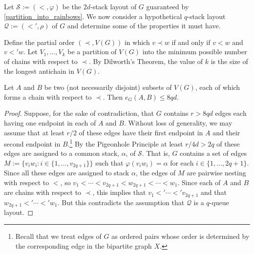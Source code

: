\documentclass{patmorin}
\begin{document}
Let $\mathcal{S}:=(<,\varphi)$ be the $2d$-stack layout of $G$ guaranteed by \cref{partition_into_rainbows}.  We now consider a hypothetical $q$-stack layout $\mathcal{Q}:=(<',\rho)$ of $G$ and determine some of the properties it must have.

Define the partial order $(\prec,V(G))$ in which $v\prec w$ if and only if $v < w$ and $v <' w$.  Let $V_1,\ldots,V_k$ be a partition of $V(G)$ into the minimum possible number of chains with respect to $\prec$.  By Dilworth's Theorem, the value of $k$ is the size of the longest antichain in $V(G)$.

\begin{lem}\label{few_edges_between_sets}
  Let $A$ and $B$ be two (not necessarily disjoint) subsets of $V(G)$, each of which forms a chain with respect to $\prec$.  Then $e_G(A,B)\le 8qd$.
\end{lem}

\begin{proof}
  Suppose, for the sake of contradiction, that $G$ contains $r > 8qd$ edges each having one endpoint in each of $A$ and $B$.  Without loss of generality, we may assume that at least $r/2$ of these edges have their first endpoint in $A$ and their second endpoint in $B$.\footnote{Recall that we treat edges of $G$ as ordered pairs whose order is determined by the corresponding edge in the bipartite graph $X$.}  By the Pigeonhole Principle at least $r/4d>2q$ of these edges are assigned to a common stack, $\alpha$, of $\mathcal{S}$.  That is, $G$ contains a set of edges $M:=\{v_iw_i:i\in\{1,\ldots,v_{2q+1}\}\}$ such that $\varphi(v_iw_i)=\alpha$ for each $i\in\{1,\ldots,2q+1\}$.  Since all these edges are assigned to stack $\alpha$, the edges of $M$ are pairwise nesting with respect to $<$, so $v_1<\cdots<v_{2q+1} < w_{2q+1}<\cdots<w_1$.  Since each of $A$ and $B$ are chains with respect to $\prec$, this implies that $v_1<'\cdots<'v_{2q+1}$ and that $w_{2q+1}<'\cdots<'w_{1}$.  But this  contradicts the assumption that $\mathcal{Q}$ is a $q$-queue layout.
\end{proof}
\end{document}
